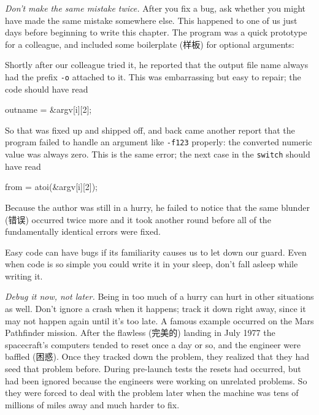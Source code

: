 \emph{Don't make the same mistake twice.} After you fix a bug, ask whether
you might have made the same mistake somewhere else. This happened to one
of us just days before beginning to write this chapter. The program was a
quick prototype for a colleague, and included some boilerplate (样板) for
optional arguments:
\begin{badcode}
    for (i = 1; i < argc; i++) {
        if (argv[i][0] != '-')  /* options finished */
            break;
        switch (argv[i][1]) {
        case 'o':           /* output filename */
            outname = argv[i];
            break;
        case 'f':
            from = atoi(argv[i]);
            break;
        case 't':
            to = atoi(argv[i]);
            break;
        ...
\end{badcode}
Shortly after our colleague tried it, he reported that the output file name
always had the prefix \verb'-o' attached to it. This was embarrassing but
easy to repair; the code should have read 
\begin{wellcode}
    outname = &argv[i][2];
\end{wellcode}
So that was fixed up and shipped off, and back came another report that the
program failed to handle an argument like \verb'-f123' properly: the
converted numeric value was always zero. This is the same error; the next
case in the \verb'switch' should have read
\begin{wellcode}
    from = atoi(&argv[i][2]);
\end{wellcode}
Because the author was still in a hurry, he failed to notice that the same
blunder (错误) occurred twice more and it took another round before all of
the fundamentally identical errors were fixed.

Easy code can have bugs if its familiarity causes us to let down our guard.
Even when code is so simple you could write it in your sleep, don't fall
asleep while writing it.

\emph{Debug it now, not later.} Being in too much of a hurry can hurt in
other situations as well. Don't ignore a crash when it happens; track it
down right away, since it may not happen again until it's too late. A
famous example occurred on the Mars Pathfinder mission. After the flawless
(完美的) landing in July 1977 the spacecraft's computers tended to reset
once a day or so, and the engineer were baffled (困惑). Once they tracked
down the problem, they realized that they had seed that problem before.
During pre-launch tests the resets had occurred, but had been ignored
because the engineers were working on unrelated problems. So they were
forced to deal with the problem later when the machine was tens of millions
of miles away and much harder to fix.

